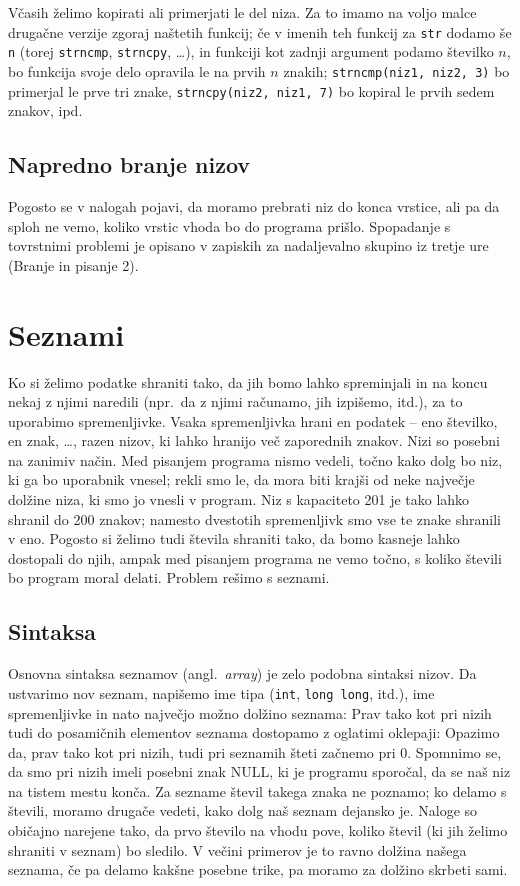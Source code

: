 \documentclass{book}
\begin{document}
Včasih želimo kopirati ali primerjati le del niza.
Za to imamo na voljo malce drugačne verzije zgoraj naštetih funkcij; če v imenih
teh funkcij za \verb+str+ dodamo še \verb+n+ (torej \verb+strncmp+,
\verb+strncpy+, \ldots), in funkciji kot zadnji argument podamo številko $n$, bo
funkcija svoje delo opravila le na prvih $n$ znakih;
\verb+strncmp(niz1, niz2, 3)+ bo primerjal le prve tri znake,
\verb+strncpy(niz2, niz1, 7)+ bo kopiral le prvih sedem znakov, ipd.

\section{Napredno branje nizov}

Pogosto se v nalogah pojavi, da moramo prebrati niz do konca vrstice, ali pa da
sploh ne vemo, koliko vrstic vhoda bo do programa prišlo.
Spopadanje s tovrstnimi problemi je opisano v zapiskih za nadaljevalno skupino
iz tretje ure (Branje in pisanje 2).

\chapter{Seznami}

Ko si želimo podatke shraniti tako, da jih bomo lahko spreminjali in na koncu
nekaj z njimi naredili (npr.~da z njimi računamo, jih izpišemo, itd.), za to
uporabimo spremenljivke.
Vsaka spremenljivka hrani en podatek -- eno številko, en znak, \ldots, razen
nizov, ki lahko hranijo več zaporednih znakov.
Nizi so posebni na zanimiv način.
Med pisanjem programa nismo vedeli, točno kako dolg bo niz, ki ga bo uporabnik
vnesel; rekli smo le, da mora biti krajši od neke največje dolžine niza, ki smo
jo vnesli v program.
Niz s kapaciteto 201 je tako lahko shranil do 200 znakov; namesto dvestotih
spremenljivk smo vse te znake shranili v eno.
Pogosto si želimo tudi števila shraniti tako, da bomo kasneje lahko dostopali do
njih, ampak med pisanjem programa ne vemo točno, s koliko števili bo program
moral delati.
Problem rešimo s seznami.

\section{Sintaksa}

Osnovna sintaksa seznamov (angl.~\textit{array}) je zelo podobna sintaksi nizov.
Da ustvarimo nov seznam, napišemo ime tipa (\verb+int+, \verb+long long+, itd.),
ime spremenljivke in nato največjo možno dolžino seznama:
Prav tako kot pri nizih tudi do posamičnih elementov seznama dostopamo z
oglatimi oklepaji:
Opazimo da, prav tako kot pri nizih, tudi pri seznamih šteti začnemo pri 0.
Spomnimo se, da smo pri nizih imeli posebni znak NULL, ki je programu sporočal,
da se naš niz na tistem mestu konča.
Za sezname števil takega znaka ne poznamo; ko delamo s števili, moramo drugače
vedeti, kako dolg naš seznam dejansko je.
Naloge so običajno narejene tako, da prvo število na vhodu pove, koliko števil
(ki jih želimo shraniti v seznam) bo sledilo.
V večini primerov je to ravno dolžina našega seznama, če pa delamo kakšne
posebne trike, pa moramo za dolžino skrbeti sami.
\end{document}
